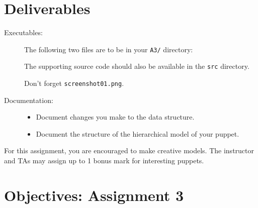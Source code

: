 \section{Deliverables}
\begin{description}
\item[Executables:] \hfill
  The following two files are to be in your \texttt{A3/} directory:
	The supporting source code should also be available in the
	{\tt src} directory.

    Don't forget \texttt{screenshot01.png}.

\item[Documentation:] \hfill
	\begin{itemize}
	\item Document changes you make to the data structure.
	\item Document the structure of the hierarchical model of your puppet.
	\end{itemize}
\end{description}

For this assignment, you are encouraged to make creative models.
The instructor and TAs may assign up to 1 bonus mark for interesting
puppets.

\newpage
\section{Objectives: \hfill Assignment 3}

 \bigskip

 \bigskip

 \bigskip

 \bigskip

